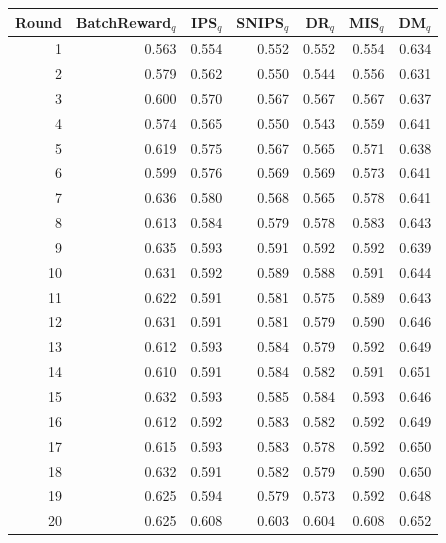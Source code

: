 \begin{tabular}{rrrrrrr}
\toprule
Round & BatchReward$_q$ & IPS$_q$ & SNIPS$_q$ & DR$_q$ & MIS$_q$ & DM$_q$ \\
\midrule
1 & 0.563 & 0.554 & 0.552 & 0.552 & 0.554 & 0.634 \\
2 & 0.579 & 0.562 & 0.550 & 0.544 & 0.556 & 0.631 \\
3 & 0.600 & 0.570 & 0.567 & 0.567 & 0.567 & 0.637 \\
4 & 0.574 & 0.565 & 0.550 & 0.543 & 0.559 & 0.641 \\
5 & 0.619 & 0.575 & 0.567 & 0.565 & 0.571 & 0.638 \\
6 & 0.599 & 0.576 & 0.569 & 0.569 & 0.573 & 0.641 \\
7 & 0.636 & 0.580 & 0.568 & 0.565 & 0.578 & 0.641 \\
8 & 0.613 & 0.584 & 0.579 & 0.578 & 0.583 & 0.643 \\
9 & 0.635 & 0.593 & 0.591 & 0.592 & 0.592 & 0.639 \\
10 & 0.631 & 0.592 & 0.589 & 0.588 & 0.591 & 0.644 \\
11 & 0.622 & 0.591 & 0.581 & 0.575 & 0.589 & 0.643 \\
12 & 0.631 & 0.591 & 0.581 & 0.579 & 0.590 & 0.646 \\
13 & 0.612 & 0.593 & 0.584 & 0.579 & 0.592 & 0.649 \\
14 & 0.610 & 0.591 & 0.584 & 0.582 & 0.591 & 0.651 \\
15 & 0.632 & 0.593 & 0.585 & 0.584 & 0.593 & 0.646 \\
16 & 0.612 & 0.592 & 0.583 & 0.582 & 0.592 & 0.649 \\
17 & 0.615 & 0.593 & 0.583 & 0.578 & 0.592 & 0.650 \\
18 & 0.632 & 0.591 & 0.582 & 0.579 & 0.590 & 0.650 \\
19 & 0.625 & 0.594 & 0.579 & 0.573 & 0.592 & 0.648 \\
20 & 0.625 & 0.608 & 0.603 & 0.604 & 0.608 & 0.652 \\
\bottomrule
\end{tabular}
